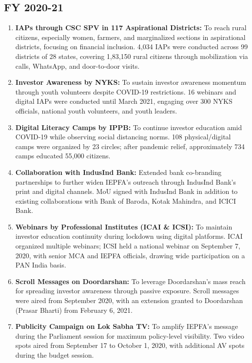 \documentclass[openany]{book}
\begin{document}
\subsection{FY 2020-21}
\begin{enumerate}
    \item \textbf{IAPs through CSC SPV in 117 Aspirational Districts:} To reach rural citizens, especially women, farmers, and marginalized sections in aspirational districts, focusing on financial inclusion. 4,034 IAPs were conducted across 99 districts of 28 states, covering 1,83,150 rural citizens through mobilization via calls, WhatsApp, and door-to-door visits.
    \item \textbf{Investor Awareness by NYKS:} To sustain investor awareness momentum through youth volunteers despite COVID-19 restrictions. 16 webinars and digital IAPs were conducted until March 2021, engaging over 300 NYKS officials, national youth volunteers, and youth leaders.
    \item \textbf{Digital Literacy Camps by IPPB:} To continue investor education amid COVID-19 while observing social distancing norms. 108 physical/digital camps were organized by 23 circles; after pandemic relief, approximately 734 camps educated 55,000 citizens.
    \item \textbf{Collaboration with IndusInd Bank:} Extended bank co-branding partnerships to further widen IEPFA's outreach through IndusInd Bank's print and digital channels. MoU signed with IndusInd Bank in addition to existing collaborations with Bank of Baroda, Kotak Mahindra, and ICICI Bank.
    \item \textbf{Webinars by Professional Institutes (ICAI \& ICSI):} To maintain investor education continuity during lockdown using digital platforms. ICAI organized multiple webinars; ICSI held a national webinar on September 7, 2020, with senior MCA and IEPFA officials, drawing wide participation on a PAN India basis.
    \item \textbf{Scroll Messages on Doordarshan:} To leverage Doordarshan's mass reach for spreading investor awareness through passive exposure. Scroll messages were aired from September 2020, with an extension granted to Doordarshan (Prasar Bharti) from February 6, 2021.
    \item \textbf{Publicity Campaign on Lok Sabha TV:} To amplify IEPFA's message during the Parliament session for maximum policy-level visibility. Two video spots aired from September 17 to October 1, 2020, with additional AV spots during the budget session.

\end{enumerate}
\end{document}
